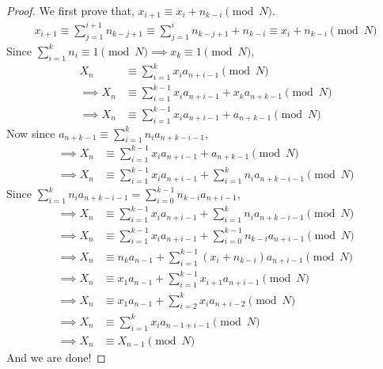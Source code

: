 \documentclass[11pt,numbers=noenddot,svgnames,dvipsnames]{scrartcl}
\begin{document}
\begin{proof}
    We first prove that, $x_{i+1} \equiv x_{i} + n_{k-i} \pmod{N}$. 
    \begin{align*}
        x_{i+1} \equiv \sum_{j=1}^{i+1} n_{k-j+1} 
                \equiv \sum_{j=1}^{i} n_{k-j+1} + n_{k-i} 
                \equiv x_{i} + n_{k-i} \pmod{N}
    \end{align*}
    Since $\sum_{i=1}^{k} n_{i} \equiv 1 \pmod{N} \implies x_{k} \equiv 1 \pmod{N}$,
    \begin{align*}
                 X_{n} &\equiv \sum_{i=1}^{k} x_{i} a_{n+i-1} \pmod{N} \\
        \implies X_{n} &\equiv \sum_{i=1}^{k-1} x_{i} a_{n+i-1} + x_{k} a_{n+k-1} \pmod{N} \\
        \implies X_{n} &\equiv \sum_{i=1}^{k-1} x_{i} a_{n+i-1} + a_{n+k-1} \pmod{N}
    \end{align*}
    Now since $a_{n+k-1}\equiv \sum_{i=1}^{k} n_{i} a_{n+k-i-1}$,
    \begin{align*}
       \implies X_{n} &\equiv \sum_{i=1}^{k-1} x_{i} a_{n+i-1} + a_{n+k-1} \pmod{N} \\
       \implies X_{n} &\equiv \sum_{i=1}^{k-1} x_{i} a_{n+i-1} + \sum_{i=1}^{k} n_{i} a_{n+k-i-1} \pmod{N}
    \end{align*}
    Since $\sum_{i=1}^{k} n_{i} a_{n+k-i-1} = \sum_{i=0}^{k-1} n_{k-i} a_{n+i-1}$,
    \begin{align*}
       \implies X_{n} &\equiv \sum_{i=1}^{k-1} x_{i} a_{n+i-1} + \sum_{i=1}^{k} n_{i} a_{n+k-i-1} \pmod{N} \\
       \implies X_{n} &\equiv \sum_{i=1}^{k-1} x_{i} a_{n+i-1} + \sum_{i=0}^{k-1} n_{k-i} a_{n+i-1} \pmod{N} \\
       \implies X_{n} &\equiv n_{k} a_{n-1} + \sum_{i=1}^{k-1} \left( x_{i} + n_{k-i} \right) a_{n+i-1} \pmod{N} \\
       \implies X_{n} &\equiv x_{1} a_{n-1} + \sum_{i=1}^{k-1} x_{i+1} a_{n+i-1} \pmod{N} \\
       \implies X_{n} &\equiv x_{1} a_{n-1} + \sum_{i=2}^{k} x_{i} a_{n+i-2} \pmod{N} \\
       \implies X_{n} &\equiv \sum_{i=1}^{k} x_{i} a_{n-1+i-1} \pmod{N} \\
       \implies X_{n} &\equiv X_{n-1} \pmod{N}
    \end{align*}
    And we are done!
\end{proof}
\end{document}
